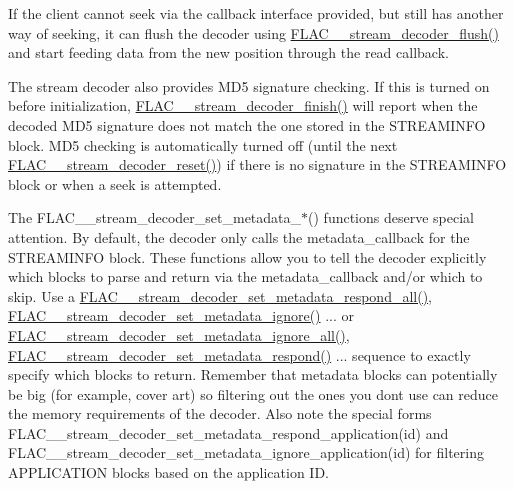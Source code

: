 If the client cannot seek via the callback interface provided, but still has another way of seeking, it can flush the decoder using \mbox{\hyperlink{group__flac__stream__decoder_ga0109ce87f2c648b224b68c08b3c090cb}{F\+L\+A\+C\+\_\+\+\_\+stream\+\_\+decoder\+\_\+flush()}} and start feeding data from the new position through the read callback.

The stream decoder also provides M\+D5 signature checking. If this is turned on before initialization, \mbox{\hyperlink{group__flac__stream__decoder_gaa51bb38f762ee11b320a0839f165c5ce}{F\+L\+A\+C\+\_\+\+\_\+stream\+\_\+decoder\+\_\+finish()}} will report when the decoded M\+D5 signature does not match the one stored in the S\+T\+R\+E\+A\+M\+I\+N\+FO block. M\+D5 checking is automatically turned off (until the next \mbox{\hyperlink{group__flac__stream__decoder_ga2342cf4f3caf9ad20fca1373aaea0c27}{F\+L\+A\+C\+\_\+\+\_\+stream\+\_\+decoder\+\_\+reset()}}) if there is no signature in the S\+T\+R\+E\+A\+M\+I\+N\+FO block or when a seek is attempted.

The F\+L\+A\+C\+\_\+\+\_\+stream\+\_\+decoder\+\_\+set\+\_\+metadata\+\_\+$\ast$() functions deserve special attention. By default, the decoder only calls the metadata\+\_\+callback for the S\+T\+R\+E\+A\+M\+I\+N\+FO block. These functions allow you to tell the decoder explicitly which blocks to parse and return via the metadata\+\_\+callback and/or which to skip. Use a \mbox{\hyperlink{group__flac__stream__decoder_gaf3bec52172d727a4db8209b82db00c84}{F\+L\+A\+C\+\_\+\+\_\+stream\+\_\+decoder\+\_\+set\+\_\+metadata\+\_\+respond\+\_\+all()}}, \mbox{\hyperlink{group__flac__stream__decoder_ga0fb395d7c18c136d5a84869f6f2d736f}{F\+L\+A\+C\+\_\+\+\_\+stream\+\_\+decoder\+\_\+set\+\_\+metadata\+\_\+ignore()}} ... or \mbox{\hyperlink{group__flac__stream__decoder_ga6e515420f5b2a5422cd333b3d4c21064}{F\+L\+A\+C\+\_\+\+\_\+stream\+\_\+decoder\+\_\+set\+\_\+metadata\+\_\+ignore\+\_\+all()}}, \mbox{\hyperlink{group__flac__stream__decoder_ga1644555cae7c54215c39bb4971100728}{F\+L\+A\+C\+\_\+\+\_\+stream\+\_\+decoder\+\_\+set\+\_\+metadata\+\_\+respond()}} ... sequence to exactly specify which blocks to return. Remember that metadata blocks can potentially be big (for example, cover art) so filtering out the ones you don\textquotesingle{}t use can reduce the memory requirements of the decoder. Also note the special forms F\+L\+A\+C\+\_\+\+\_\+stream\+\_\+decoder\+\_\+set\+\_\+metadata\+\_\+respond\+\_\+application(id) and F\+L\+A\+C\+\_\+\+\_\+stream\+\_\+decoder\+\_\+set\+\_\+metadata\+\_\+ignore\+\_\+application(id) for filtering A\+P\+P\+L\+I\+C\+A\+T\+I\+ON blocks based on the application ID.

